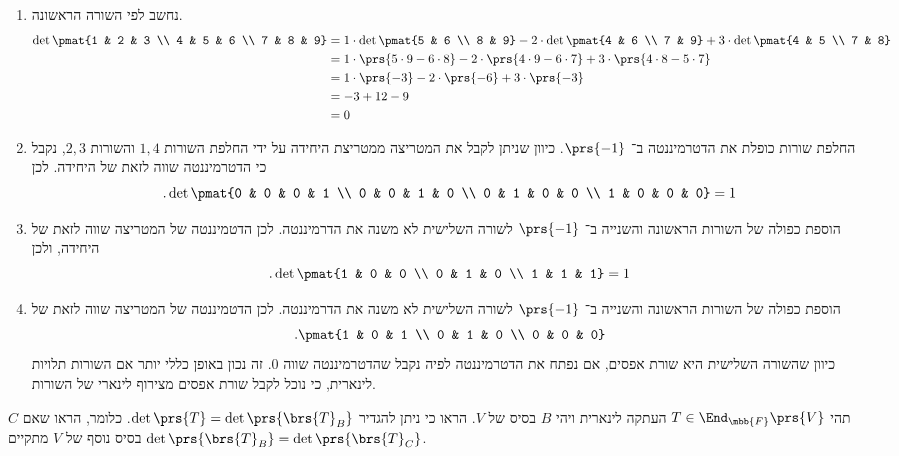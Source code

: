 \documentclass[a4paper,10pt,twoside,openany]{book}
\begin{document}
\begin{solution}
\begin{enumerate}
\item
נחשב לפי השורה הראשונה.
\begin{align*}
\det \pmat{1 & 2 & 3 \\ 4 & 5 & 6 \\ 7 & 8 & 9} &= 1 \cdot \det\pmat{5 & 6 \\ 8 & 9} - 2 \cdot \det \pmat{4 & 6 \\ 7 & 9} + 3 \cdot \det \pmat{4 & 5 \\ 7 & 8}
\\&=
1 \cdot \prs{5 \cdot 9 - 6 \cdot 8} - 2 \cdot \prs{4 \cdot 9 - 6 \cdot 7} + 3 \cdot \prs{4 \cdot 8 - 5 \cdot 7}
\\&=
1 \cdot \prs{-3} -2 \cdot \prs{-6} + 3 \cdot \prs{-3}
\\&=
-3 + 12 - 9
\\&= 0
\end{align*}
\item החלפת שורות כופלת את הדטרמיננטה ב־%
$\prs{-1}$.
כיוון שניתן לקבל את המטריצה ממטריצת היחידה על ידי החלפת השורות
$1,4$
והשורות
$2,3$,
נקבל כי הדטרמיננטה שווה לזאת של היחידה. לכן
\[\text{.} \det \pmat{0 & 0 & 0 & 1 \\ 0 & 0 & 1 & 0 \\ 0 & 1 & 0 & 0 \\ 1 & 0 & 0 & 0} = 1\]
\item
הוספת כפולה של השורות הראשונה והשנייה ב־%
$\prs{-1}$
לשורה השלישית לא משנה את הדרמיננטה. לכן הדטמיננטה של המטריצה שווה לזאת של היחידה, ולכן
\[\text{.} \det \pmat{1 & 0 & 0 \\ 0 & 1 & 0 \\ 1 & 1 & 1} = 1\]
\item
הוספת כפולה של השורות הראשונה והשנייה ב־%
$\prs{-1}$
לשורה השלישית לא משנה את הדרמיננטה. לכן הדטמיננטה של המטריצה שווה לזאת של
\begin{align*}
\text{.} \pmat{1 & 0 & 1 \\ 0 & 1 & 0 \\ 0 & 0 & 0}
\end{align*}
כיוון שהשורה השלישית היא שורת אפסים, אם נפתח את הדטרמיננטה לפיה נקבל שהדטרמיננטה שווה
$0$.
זה נכון באופן כללי יותר אם השורות תלויות לינארית, כי נוכל לקבל שורת אפסים מצירוף לינארי של השורות.
\end{enumerate}
\end{solution}

\begin{exercisechap}
תהי
$T \in \End_{\mbb{F}}\prs{V}$
העתקה לינארית ויהי
$B$
בסיס של
$V$.
הראו כי ניתן להגדיר
$\det\prs{T} = \det\prs{\brs{T}_B}$.
כלומר, הראו שאם
$C$
בסיס נוסף של
$V$
מתקיים
$\det\prs{\brs{T}_B} = \det\prs{\brs{T}_C}$.
\end{exercisechap}
\end{document}
